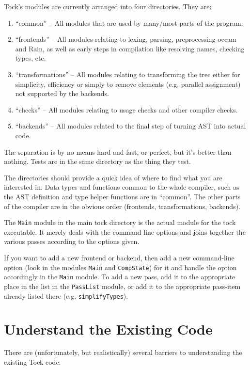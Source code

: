 \documentclass[a4wide]{article}
\begin{document}
Tock's modules are currently arranged into four directories.  They are:

\begin{enumerate}
\item ``common'' -- All modules that are used by many/most parts of the program.
\item ``frontends'' -- All modules relating to lexing, parsing, preprocessing occam and Rain, as well
as early steps in compilation like resolving names, checking types, etc.
\item ``transformations'' -- All modules relating to transforming the tree either for simplicity,
efficiency or simply to remove elements (e.g. parallel assignment) not supported by the backends.
\item ``checks'' -- All modules relating to usage checks and other compiler checks.
\item ``backends'' -- All modules related to the final step of turning AST into actual code.
\end{enumerate}

The separation is by no means hard-and-fast, or perfect, but it's better than nothing.
Tests are in the same directory as the thing they test.

The directories should provide a quick idea of where to find what you are interested in.  Data types
and functions common to the whole compiler, such as the AST definition and type helper functions
are in ``common''.  The other parts of the compiler are in the obvious order (frontends, transformations,
backends).

The \lstinline|Main| module in the main tock directory is the actual module for the tock executable.
It merely deals with the command-line options and joins together the various passes according to
the options given.

If you want to add a new frontend or backend, then add a new command-line option (look in the modules
\lstinline|Main| and \lstinline|CompState|) for it and handle the option accordingly in the \lstinline|Main|
module.  To add a new pass, add it to the appropriate place in the list in the \lstinline|PassList|
module, or add it to the appropriate pass-item already listed there (e.g. \lstinline|simplifyTypes|).

\section{Understand the Existing Code}

There are (unfortunately, but realistically) several barriers to understanding the existing Tock code:
\end{document}
